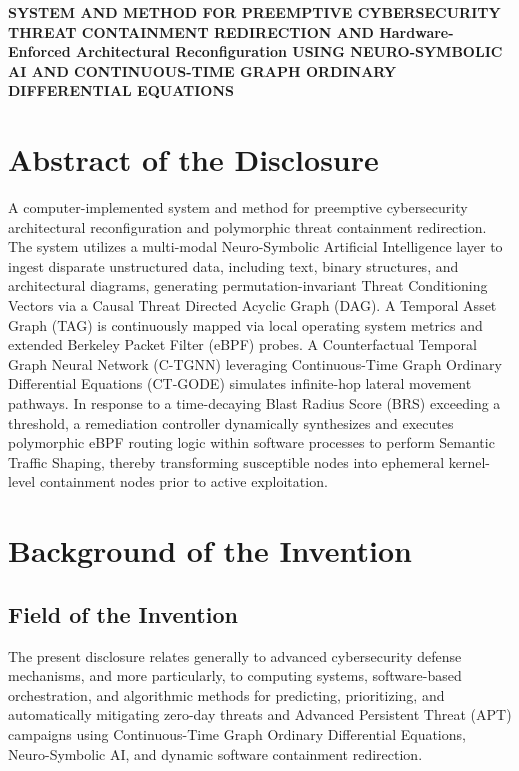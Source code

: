\documentclass[12pt, letterpaper]{article}
\begin{document}
\begin{center}
    {\Large \textbf{SYSTEM AND METHOD FOR PREEMPTIVE CYBERSECURITY THREAT CONTAINMENT REDIRECTION AND Hardware-Enforced Architectural Reconfiguration USING NEURO-SYMBOLIC AI AND CONTINUOUS-TIME GRAPH ORDINARY DIFFERENTIAL EQUATIONS}}
\end{center}

\vspace{1em}

\section*{Abstract of the Disclosure}
A computer-implemented system and method for preemptive cybersecurity architectural reconfiguration and polymorphic threat containment redirection. The system utilizes a multi-modal Neuro-Symbolic Artificial Intelligence layer to ingest disparate unstructured data, including text, binary structures, and architectural diagrams, generating permutation-invariant Threat Conditioning Vectors via a Causal Threat Directed Acyclic Graph (DAG). A Temporal Asset Graph (TAG) is continuously mapped via local operating system metrics and extended Berkeley Packet Filter (eBPF) probes. A Counterfactual Temporal Graph Neural Network (C-TGNN) leveraging Continuous-Time Graph Ordinary Differential Equations (CT-GODE) simulates infinite-hop lateral movement pathways. In response to a time-decaying Blast Radius Score (BRS) exceeding a threshold, a remediation controller dynamically synthesizes and executes polymorphic eBPF routing logic within software processes to perform Semantic Traffic Shaping, thereby transforming susceptible nodes into ephemeral kernel-level containment nodes prior to active exploitation.

\section{Background of the Invention}
\subsection{Field of the Invention}
The present disclosure relates generally to advanced cybersecurity defense mechanisms, and more particularly, to computing systems, software-based orchestration, and algorithmic methods for predicting, prioritizing, and automatically mitigating zero-day threats and Advanced Persistent Threat (APT) campaigns using Continuous-Time Graph Ordinary Differential Equations, Neuro-Symbolic AI, and dynamic software containment redirection.
\end{document}
